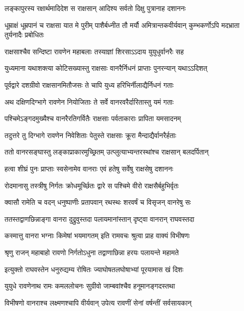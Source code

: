 \twolineshloka
{लङ्कापुरस्य रक्षार्थमादिदेश स राक्षसान्}
{आदिश्य सर्वतो दिक्षु पुत्रानाह दशाननः} %

\threelineshloka
{धूम्राक्षं धूम्रपानं च राक्षसा यात मे पुरीम्}
{पाशैर्बध्नीत तौ मर्यौ अमित्रान्तकवीर्यवान्}
{कुम्भकर्णोऽपि मदभ्राता तुर्यनादैः प्रबोधितः} %

\twolineshloka
{राक्षसाश्चैव सन्दिष्टा रावणेन महाबलाः}
{तस्याज्ञां शिरसाऽऽदाय युयुधुर्वानरैः सह} %

\twolineshloka
{युध्यमाना यथाशक्त्या कोटिसख्यास्तु राक्षसाः}
{वानरैर्निधनं प्राप्ताः पुनरन्यान् यथाऽऽदिशत्} %

\twolineshloka
{पूर्वद्वारे दशग्रीवो राक्षसानमितौजसः}
{ते चापि युध्य हरिभिर्नीलाद्यैर्निधनं गताः} %

\twolineshloka
{अथ दक्षिणदिग्भागे रावणेन नियोजिताः}
{ते सर्वे वानरवरैर्दारितास्तु यमं गताः} %

\twolineshloka
{पश्चिमेऽङ्गदमुख्यैश्च वानरैरतिगर्वितैः}
{राक्षसाः पर्वताकाराः प्रापिता यमसादनम्} %

\twolineshloka
{तदुत्तरे तु दिग्भागे रावणेन निवेशिताः}
{पेतुस्ते राक्षसाः क्रूरा मैन्दाद्यैर्वानरैर्हताः} %

\twolineshloka
{ततो वानरसङ्घास्तु लङ्काप्राकारमुच्छ्रितम्}
{उत्प्लुत्याभ्यन्तरस्थांश्च राक्षसान् बलदर्पितान्} %

\twolineshloka
{हत्वा शीघ्रं पुनः प्राप्ताः स्वसेनामेव वानराः}
{एवं हतेषु सर्वेषु राक्षसेषु दशाननः} %

\twolineshloka
{रोदमानासु तस्त्रीषु निर्गतः क्रोधमूर्च्छितः}
{द्वारे स पश्चिमे वीरो राक्षसैर्बहुभिर्वृतः} %

\twolineshloka
{क्वासौ रामेति च वदन् धनुष्पाणीः प्रतापवान्}
{रथस्थः शरवर्षं च विसृजन् वानरेषु सः} %

\twolineshloka
{ततस्तद्वाणछिन्नाङ्गा वानरा दुद्रुवुस्तदा}
{पलायमानांस्तान् दृष्ट्वा वानरान् राघवस्तदा} %

\twolineshloka
{कस्मात्तु वानरा भग्नाः किमेषां भयमागतम्}
{इति रामवचः श्रुत्वा प्राह वाक्यं विभीषणः} %

\twolineshloka
{श्रृणु राजन् महाबाहो रावणो निर्गतोऽधुना}
{तद्वाणाछिन्ना हरयः पलायन्ते महामते} %

\twolineshloka
{इत्युक्तो राघवस्तेन धनुरुद्यम्य रोषितः}
{ज्याघोषतलघोषाभ्यां पूरयामास खं दिशः} %

\twolineshloka
{युयुधे रावणेनाथ रामः कमललोचनः}
{सुग्रीवो जाम्बवांश्चैव हनूमानङ्गदस्तथा} %

\twolineshloka
{विभीषणो वानराश्च लक्ष्मणश्चापि वीर्यवान्}
{उपेत्य रावणीं सेनां वर्षन्तीं सर्वसायकान्} %

